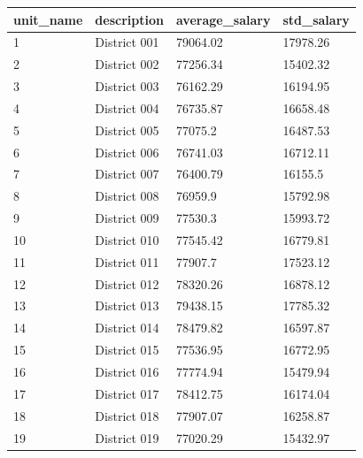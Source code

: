 \documentclass{article}
\begin{document}
\begin{table}[h]
\centering
\begin{tabular}{|l|l|l|l|}
\hline
unit\_name & description                             & average\_salary & std\_salary \\
\hline
1          & District 001                            & 79064.02        & 17978.26    \\
2          & District 002                            & 77256.34        & 15402.32    \\
3          & District 003                            & 76162.29        & 16194.95    \\
4          & District 004                            & 76735.87        & 16658.48    \\
5          & District 005                            & 77075.2         & 16487.53    \\
6          & District 006                            & 76741.03        & 16712.11    \\
7          & District 007                            & 76400.79        & 16155.5     \\
8          & District 008                            & 76959.9         & 15792.98    \\
9          & District 009                            & 77530.3         & 15993.72    \\
10         & District 010                            & 77545.42        & 16779.81    \\
11         & District 011                            & 77907.7         & 17523.12    \\
12         & District 012                            & 78320.26        & 16878.12    \\
13         & District 013                            & 79438.15        & 17785.32    \\
14         & District 014                            & 78479.82        & 16597.87    \\
15         & District 015                            & 77536.95        & 16772.95    \\
16         & District 016                            & 77774.94        & 15479.94    \\
17         & District 017                            & 78412.75        & 16174.04    \\
18         & District 018                            & 77907.07        & 16258.87    \\
19         & District 019                            & 77020.29        & 15432.97    \\

\end{tabular}
\end{table}
\end{document}

